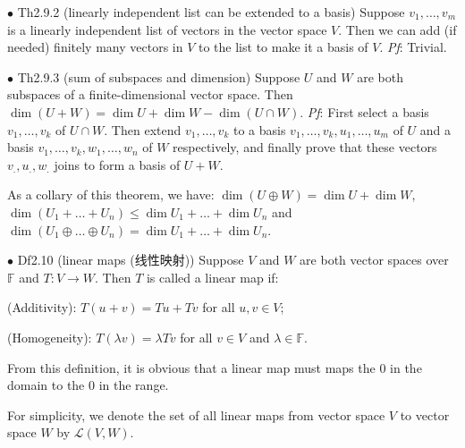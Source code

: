 \documentclass{article}
\begin{document}
\begin{Th}{$\bullet$ Th2.9.2 (linearly independent list can be extended to a basis)}
    Suppose $v_1, \dots, v_m$ is a linearly independent list of vectors in the vector space $V$. Then we can add (if needed) finitely many vectors in $V$ to the list to make it a basis of $V$.
    \tcblower
    \textit{Pf}: Trivial. 
\end{Th}

\begin{Th}{$\bullet$ Th2.9.3 (sum of subspaces and dimension)}
    Suppose $U$ and $W$ are both subspaces of a finite-dimensional vector space. Then $\dim (U+W) = \dim U+\dim W-\dim(U\cap W)$.
    \tcblower
    \textit{Pf}: First select a basis $v_1, \dots, v_k$ of $U\cap W$. Then extend $v_1, \dots, v_k$ to a basis $v_1, \dots, v_k, u_1, \dots, u_m$ of $U$ and a basis $v_1, \dots, v_k, w_1, \dots, w_n$ of $W$ respectively, and finally prove that these vectors $v_., u_., w_.$ joins to form a basis of $U+W$.
\end{Th}

\begin{Rmk}{}
    As a collary of this theorem, we have: \textcolor{Th}{$\dim (U\oplus W) = \dim U+\dim W$, $\dim (U_1+\dots +U_n)\leq \dim U_1 + \dots + \dim U_n$ and $\dim (U_1\oplus\dots\oplus U_n) = \dim U_1 + \dots + \dim U_n$}.
\end{Rmk}

\begin{Df}{$\bullet$ Df2.10 (linear maps (线性映射))}
    Suppose $V$ and $W$ are both vector spaces over $\mathbb{F}$ and $T: V\rightarrow W$. Then $T$ is called a linear map if:
    \begin{compactenum}
        \item (Additivity): $T(u+v) = Tu+Tv$ for all $u, v\in V$;
        \item (Homogeneity): $T(\lambda v) = \lambda Tv$ for all $v\in V$ and $\lambda\in\mathbb{F}$.
    \end{compactenum}
\end{Df}

\begin{Rmk}{}
    \begin{compactenum}
        \item From this definition, \textcolor{Th}{it is obvious that a linear map must maps the $0$ in the domain to the $0$ in the range.}
        \item For simplicity, \textcolor{Df}{we denote the set of all linear maps from vector space $V$ to vector space $W$ by $\mathcal{L}(V, W)$.}
    \end{compactenum}
\end{Rmk}
\end{document}
